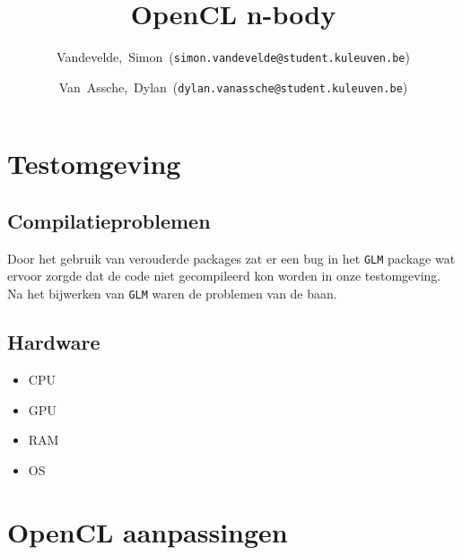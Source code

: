\documentclass{article}
\title{OpenCL n-body}
\author{Vandevelde,~Simon~(\texttt{simon.vandevelde@student.kuleuven.be})
  \and
  Van~Assche,~Dylan~(\texttt{dylan.vanassche@student.kuleuven.be})}
\begin{document}
\maketitle %

\section{Testomgeving}
\subsection{Compilatieproblemen}

Door het gebruik van verouderde packages zat er een bug in het \texttt{GLM} package wat
ervoor zorgde dat de code niet gecompileerd kon worden in onze testomgeving. Na het
bijwerken van \texttt{GLM} waren de problemen van de baan.

\subsection{Hardware}
\begin{itemize}
    \item CPU
    \item GPU
    \item RAM
    \item OS
\end{itemize}

\section{OpenCL aanpassingen}
\end{document}

